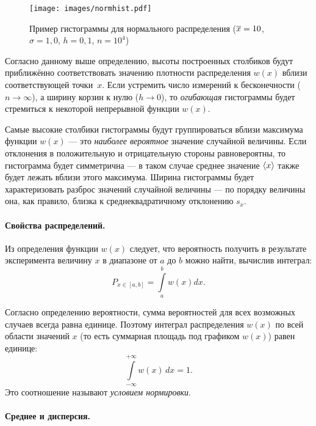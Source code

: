 \begin{figure}[ht!]
    \centering
    \texttt{[image: images/normhist.pdf]}
    \caption{Пример гистограммы для нормального распределения ($\overline{x}=10$,
$\sigma=1{,}0$, $h=0{,}1$, $n=10^{4}$)}\label{fig:normhist}
\end{figure}

Согласно данному выше определению, высоты построенных столбиков будут приближённо соответствовать значению плотности распределения $w(x)$ вблизи соответствующей точки~$x$.
Если устремить число измерений к бесконечности ($n\to \infty$), а ширину корзин
к нулю ($h\to0$), то \emph{огибающая} гистограммы будет стремиться к некоторой
непрерывной функции $w(x)$.

Самые высокие столбики гистограммы будут группироваться вблизи максимума
функции $w(x)$ --- это \emph{наиболее вероятное} значение случайной величины.
Если отклонения в положительную и отрицательную стороны равновероятны,
то гистограмма будет симметрична --- в таком случае среднее значение $\left<x\right>$
также будет лежать вблизи этого максимума. Ширина гистограммы будет характеризовать разброс
значений случайной величины --- по порядку величины
она, как правило, близка к среднеквадратичному отклонению $s_x$.

\paragraph{Свойства распределений.}

Из определения функции $w(x)$ следует, что вероятность получить в результате
эксперимента величину $x$ в диапазоне от $a$ до $b$
можно найти, вычислив интеграл:
\begin{equation}
    P_{x\in [a, b]}=\int\limits _{a}^{b}w\!\left(x\right)dx.\label{eq:P}
\end{equation}

Согласно определению вероятности, сумма вероятностей для всех возможных случаев
всегда равна единице. Поэтому интеграл распределения $w(x)$ по всей области
значений $x$ (то есть суммарная площадь под графиком $w(x)$) равен единице:
\[
\int\limits_{-\infty}^{+\infty} w(x)\,dx=1.
\]
Это соотношение называют \emph{условием нормировки}.

\paragraph{Среднее и дисперсия.}

